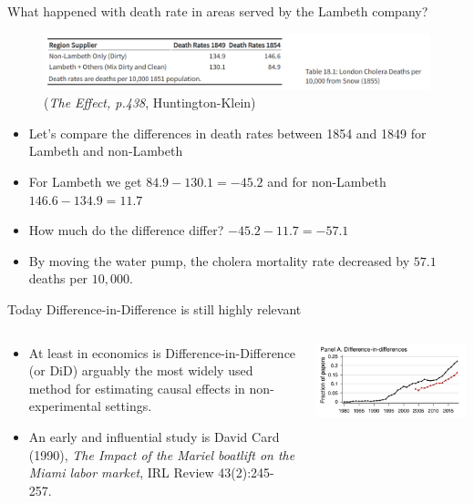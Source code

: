 \documentclass[notes,11pt, aspectratio=169]{beamer}
\begin{document}
\begin{frame}{What happened with death rate in areas served by the Lambeth company?}
\begin{figure}[H]
\centering
        \includegraphics[width=1\linewidth]{24_DiDLecture/24_DiDLecture_John Snow.png}
    \tiny (\emph{The Effect, p.438}, Huntington-Klein)
\end{figure}

\begin{itemize}
    \item Let's compare the differences in death rates between 1854 and 1849 for Lambeth and non-Lambeth
    \item For Lambeth we get $84.9 - 130.1 = -45.2$ and for non-Lambeth $146.6 - 134.9 = 11.7$ 
    \item How much do the difference differ?  $-45.2-11.7=-57.1$
    \item By moving the water pump, the cholera mortality rate decreased by $57.1$ deaths per $10,000$. 
\end{itemize}
\end{frame}

\begin{frame}{Today Difference-in-Difference is still highly relevant}
\begin{columns}
\begin{column}{0.5\textwidth}
  \begin{itemize}
        \item At least in economics is Difference-in-Difference (or DiD) arguably the most widely used method for estimating causal effects in non-experimental settings. 
        \item An early and influential study is David Card (1990), \emph{The Impact of the Mariel boatlift on the Miami labor market}, IRL Review 43(2):245-257. 
    \end{itemize}
\end{column}

\begin{column}{0.5\textwidth}
 \begin{center}
        \includegraphics[width=1\linewidth]{24_DiDLecture/24_DiDLecture_AEA_DiD.png}
    \end{center}
\end{column}
\end{columns}
\end{frame}
\end{document}
